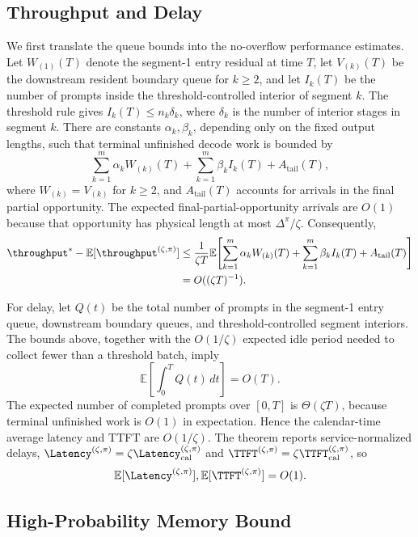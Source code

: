 \subsection{Throughput and Delay}

We first translate the queue bounds into the no-overflow performance estimates. Let \(W_{(1)}(T)\) denote the segment-1 entry residual at time \(T\), let \(V_{(k)}(T)\) be the downstream resident boundary queue for \(k\ge2\), and let \(I_k(T)\) be the number of prompts inside the threshold-controlled interior of segment \(k\). The threshold rule gives \(I_k(T)\le n_k\delta_k\), where \(\delta_k\) is the number of interior stages in segment \(k\). There are constants \(\alpha_k,\beta_k\), depending only on the fixed output lengths, such that terminal unfinished decode work is bounded by
\[
    \sum_{k=1}^m \alpha_k W_{(k)}(T)
    +
    \sum_{k=1}^m \beta_k I_k(T)
    +
    A_{\mathrm{tail}}(T),
\]
where \(W_{(k)}=V_{(k)}\) for \(k\ge2\), and \(A_{\mathrm{tail}}(T)\) accounts for arrivals in the final partial opportunity. The expected final-partial-opportunity arrivals are \(O(1)\) because that opportunity has physical length at most \(\Delta^\pi/\zeta\). Consequently,
\[
\begin{aligned}
    \throughput^*-\mathbb{E}[\throughput^{(\zeta,\pi)}]
    &\le
    \frac{1}{\zeta T}
    \mathbb{E}\!\left[
    \sum_{k=1}^m \alpha_k W_{(k)}(T)
    +
    \sum_{k=1}^m \beta_k I_k(T)
    +
    A_{\mathrm{tail}}(T)
    \right]  \\
    &= O((\zeta T)^{-1}).
\end{aligned}
\]

For delay, let \(Q(t)\) be the total number of prompts in the segment-1 entry queue, downstream boundary queues, and threshold-controlled segment interiors. The bounds above, together with the \(O(1/\zeta)\) expected idle period needed to collect fewer than a threshold batch, imply
\[
    \mathbb{E}\!\left[\int_0^T Q(t)\,dt\right]=O(T).
\]
The expected number of completed prompts over \([0,T]\) is \(\Theta(\zeta T)\), because terminal unfinished work is \(O(1)\) in expectation. Hence the calendar-time average latency and TTFT are \(O(1/\zeta)\). The theorem reports service-normalized delays, \(\Latency^{(\zeta,\pi)}=\zeta\Latency_{\rm cal}^{(\zeta,\pi)}\) and \(\TTFT^{(\zeta,\pi)}=\zeta\TTFT_{\rm cal}^{(\zeta,\pi)}\), so
\[
    \mathbb{E}[\Latency^{(\zeta,\pi)}],
    \mathbb{E}[\TTFT^{(\zeta,\pi)}]
    =
    O(1).
\]

\subsection{High-Probability Memory Bound}


